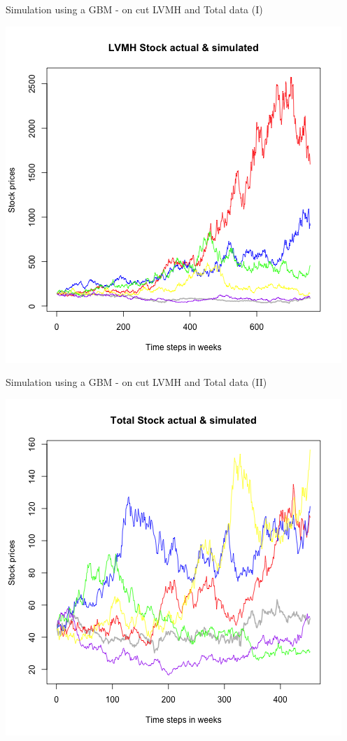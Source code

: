 \documentclass{beamer}
\begin{document}
\begin{frame}{Simulation using a GBM - on cut LVMH and Total data (I)}
	\begin{center}
		\includegraphics[scale = 0.45]{cleanedLVMH.png}
	\end{center}
\end{frame}

\begin{frame}{Simulation using a GBM - on cut LVMH and Total data (II)}
	\begin{center}
		\includegraphics[scale = 0.45]{cleanedTotal.png}
	\end{center}
\end{frame}
\end{document}
